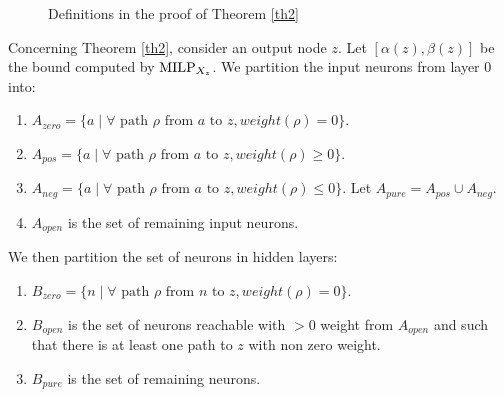 \begin{figure}[h]
	\caption{Definitions in the proof of Theorem \ref{th2}}
	\label{fig:neural_network_types_simplified}
\end{figure}
\fi


Concerning Theorem \ref{th2}, consider an output node $z$.
Let $[\alpha(z),\beta(z)]$ be the bound computed by ${\textrm{MILP}}_{X_z}$.
We partition the input neurons from layer $0$ into:
\begin{enumerate}
	\item $A_{zero}= \{a \mid \forall \text{ path $\rho$ from $a$ to } z, weight(\rho)=0\}$.
	\item $A_{pos}= \{a \mid \forall \text{ path $\rho$ from $a$ to } z, weight(\rho)\geq0\}$.
	\item  $A_{neg}= \{a \mid \forall \text{ path $\rho$ from $a$ to } z, weight(\rho)\leq0\}$.
	Let $A_{pure}=A_{pos} \cup A_{neg}$.
	\item $A_{open}$ is the set of remaining input neurons.
\end{enumerate}

We then partition the set of neurons in hidden layers: 
\begin{enumerate}
	\item $B_{zero}= \{n \mid \forall \text{ path $\rho$ from $n$ to } z, weight(\rho)=0\}$.
	\item $B_{open}$ is the set of neurons reachable with $>0$ weight from $A_{open}$ and such that there is at least one path to $z$ with non zero weight.
	\item $B_{pure}$ is the set of remaining neurons.
\end{enumerate}

